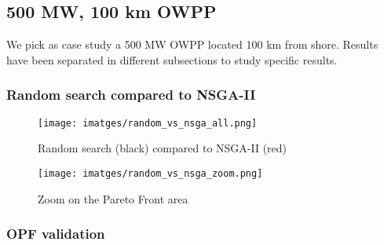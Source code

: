 \documentclass[a4paper,11pt, titlepage, twoside]{article}
\begin{document}
\subsection{500 MW, 100 km OWPP}

We pick as case study a 500 MW OWPP located 100 km from shore. Results have been separated in different subsections to study specific results.

\subsubsection{Random search compared to NSGA-II}

\begin{figure}[H]
    \centering
    \texttt{[image: imatges/random\_vs\_nsga\_all.png]}
    \caption{Random search (black) compared to NSGA-II (red)}
    \label{fig:searchall}
\end{figure}
    
\begin{figure}[H]
    \centering
    \texttt{[image: imatges/random\_vs\_nsga\_zoom.png]}
    \caption{Zoom on the Pareto Front area}
    \label{fig:paretpnsga}
\end{figure}
\subsubsection{OPF validation}
\end{document}
